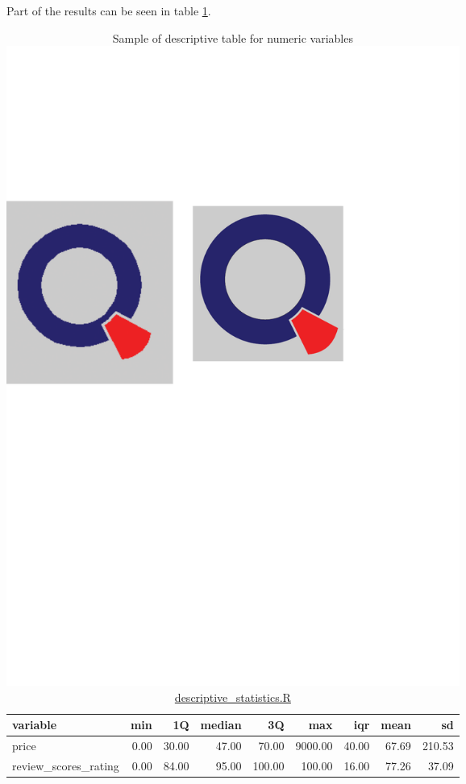 Part of the results can be seen in table \ref{table:descrstatnum}.



\begin{table}[H]
\centering
\centering
\begin{tabular}{lrrrrrrrr}
  \hline \hline
variable & min & 1Q & median & 3Q & max & iqr & mean & sd \\ 
  \hline
price & 0.00 & 30.00 & 47.00 & 70.00 & 9000.00 & 40.00 & 67.69 & 210.53 \\ 
  review\_scores\_rating & 0.00 & 84.00 & 95.00 & 100.00 & 100.00 & 16.00 & 77.26 & 37.09 \\ 
   \hline \hline
\end{tabular}
\caption{Sample of descriptive table for numeric variables \protect\includegraphics[scale=0.05]{qletlogo.pdf} {\href{https://github.com/silvia-ventoruzzo/SPL-WISE-2018/blob/master/Helpers/descriptive_statistics.R}{descriptive\_statistics.R}}}
\label{table:descrstatnum}
\end{table}

